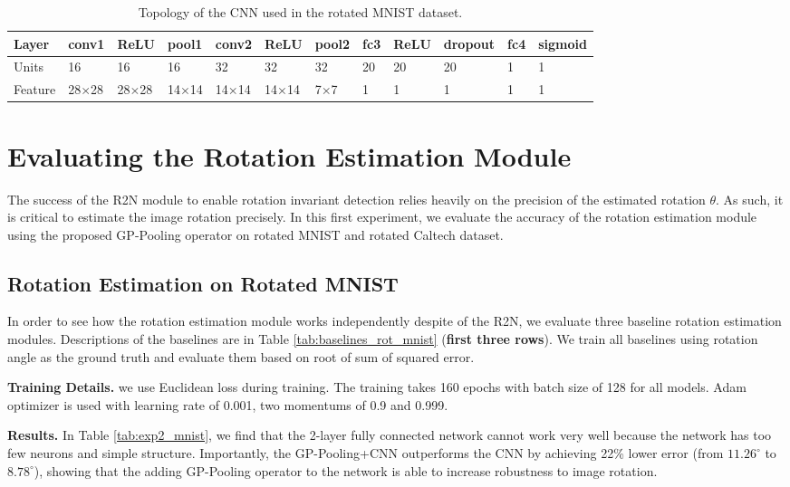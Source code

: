 \documentclass[10pt,twocolumn,letterpaper]{article}
\begin{document}
\begin{table*}[tb]
\centering
\footnotesize
\begin{tabularx}{\linewidth}{YYYYYYYYYYYY}
        \hline
        \hline
        Layer & conv1 & ReLU & pool1 & conv2 & ReLU & pool2 & fc3 & ReLU & dropout & fc4 & sigmoid \\
        \hline
        Units & 16 & 16 & 16 & 32 & 32 & 32 & 20 & 20 & 20 & 1 & 1 \\
        Feature & 28$\times$28 & 28$\times$28 & 14$\times$14 & 14$\times$14 & 14$\times$14 & 7$\times$7 & 1 & 1 & 1 & 1 & 1 \\
        \hline
\end{tabularx}
\vspace{0.05cm}
\caption{Topology of the CNN used in the rotated MNIST dataset.}
\label{tab:topo_mnist}
\end{table*}


\section{Evaluating the Rotation Estimation Module}
\label{sec:rem}

The success of the R2N module to enable rotation invariant detection relies heavily on the precision of the estimated rotation $\theta$. As such, it is critical to estimate the image rotation precisely. In this first experiment, we evaluate the accuracy of the rotation estimation module using the proposed GP-Pooling operator on rotated MNIST and rotated Caltech dataset.

\subsection{Rotation Estimation on Rotated MNIST} \label{sec:rot_mnist}
In order to see how the rotation estimation module works independently despite of the R2N, we evaluate three baseline rotation estimation modules. Descriptions of the baselines are in Table \ref{tab:baselines_rot_mnist} (\textbf{first three rows}). We train all baselines using rotation angle as the ground truth and evaluate them based on root of sum of squared error.

\vspace{1mm}\noindent\textbf{Training Details.} 
we use Euclidean loss during training. The training takes 160 epochs with batch size of 128 for all models. Adam optimizer is used with learning rate of 0.001, two momentums of 0.9 and 0.999. 

\vspace{1mm}\noindent\textbf{Results.} In Table \ref{tab:exp2_mnist}, we find that the 2-layer fully connected network cannot work very well because the network has too few neurons and simple structure. Importantly, the GP-Pooling+CNN outperforms the CNN by achieving 22\% lower error (from $11.26^{\circ}$ to $8.78^{\circ}$), showing that the adding GP-Pooling operator to the network is able to increase robustness to image rotation. 
\end{document}
